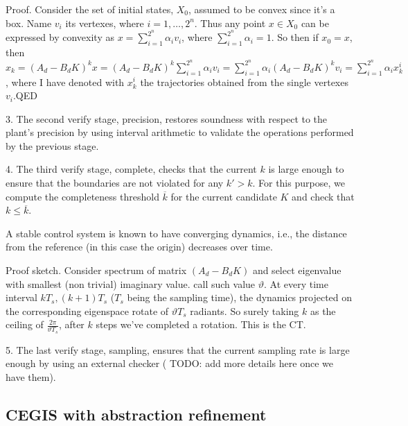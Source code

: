 \documentclass[runningheads,a4paper]{llncs}
\newcommand{\addtodo}[1]{{\color{red} TODO: #1}}
\begin{document}

Proof. 
Consider the set of initial states, $X_0$, assumed to be convex since it's a box. 
Name $v_i$ its vertexes, where $i=1,\ldots, 2^n$.  
Thus any point $x \in X_0$ can be expressed by convexity as $x = \sum_{i=1}^{2^n} \alpha_i v_i$, 
where $\sum_{i=1}^{2^n} \alpha_i =1$. 
So then if $x_0=x$, then $x_k = (A_d - B_d K)^k x = 
(A_d - B_d K)^k \sum_{i=1}^{2^n} \alpha_i v_i = 
\sum_{i=1}^{2^n} \alpha_i (A_d - B_d K)^k v_i  = 
\sum_{i=1}^{2^n} \alpha_i x_k^i$, 
where I have denoted with $x_k^i$ the trajectories obtained from the single vertexes $v_i$.QED


3. The second {\sc verify} stage, {\sc precision}, 
 restores soundness with respect to the plant's precision
by using interval arithmetic \cite{moore1966interval} to validate the 
operations performed by the previous stage. 

4. The third {\sc verify} stage, {\sc complete}, checks that the
current $k$ is large enough to ensure that the boundaries are not
violated for any $k'{>}k$.  For this purpose, we compute the
completeness threshold $\overline{k}$ for the current candidate $K$
and check that $k{\leq}\overline{k}$. 

A stable control system is known to have converging dynamics, i.e., the
distance from the reference (in this case the origin) decreases over time. 


Proof sketch. 
Consider spectrum of matrix $(A_d - B_d K)$ and select eigenvalue with smallest (non trivial) imaginary value.  
call such value $\vartheta$. 
At every time interval $kT_s, (k+1)T_s$ ($T_s$ being the sampling time), 
the dynamics projected on the corresponding eigenspace rotate of $\vartheta T_s$ radiants.  
So surely taking $k$ as the ceiling of $\frac{2\pi}{\vartheta T_s}$, after $k$ steps we've completed a rotation. 
This is the CT. 

5. The last {\sc verify} stage, {\sc sampling}, 
ensures that the current sampling rate is large enough by using an 
external checker (\addtodo{add more details here once we have them}).

\subsection{CEGIS with abstraction refinement}
\label{sec:CEGIS-abstraction-refinement}
\end{document}
